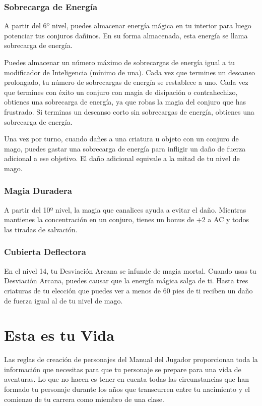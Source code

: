 \documentclass[a4paper,twocolumn,openany,10pt]{dndbook}
\begin{document}
\subsubsection{Sobrecarga de Energía}
A partir del 6º nivel, puedes almacenar energía mágica en tu interior para luego potenciar tus conjuros dañinos. En su forma
almacenada, esta energía se llama sobrecarga de energía.

Puedes almacenar un número máximo de sobrecargas de energía igual a tu modificador de Inteligencia (mínimo de una). Cada vez
que termines un descanso prolongado, tu número de sobrecargas de energía se restablece a uno. Cada vez que termines con éxito
un conjuro con magia de disipación o contrahechizo, obtienes una sobrecarga de energía, ya que robas la magia del conjuro que
has frustrado. Si terminas un descanso corto sin sobrecargas de energía, obtienes una sobrecarga de energía.

Una vez por turno, cuando dañes a una criatura u objeto con un conjuro de mago, puedes gastar una sobrecarga de energía para
infligir un daño de fuerza adicional a ese objetivo. El daño adicional equivale a la mitad de tu nivel de mago.

\subsubsection{Magia Duradera}
A partir del 10º nivel, la magia que canalices ayuda a evitar el daño. Mientras mantienes la concentración en un conjuro, tienes
un bonus de +2 a AC y todos las tiradas de salvación. 

\subsubsection{Cubierta Deflectora}
En el nivel 14, tu Desviación Arcana se infunde de magia mortal. Cuando usas tu Desviación Arcana, puedes causar que la energía
mágica salga de ti. Hasta tres criaturas de tu elección que puedes ver a menos de 60 pies de ti reciben un daño de fuerza igual
al de tu nivel de mago. 

\section{Esta es tu Vida}
Las reglas de creación de personajes del Manual del Jugador proporcionan toda la información que necesitas para que tu personaje
se prepare para una vida de aventuras. Lo que no hacen es tener en cuenta todas las circunstancias que han formado tu personaje
durante los años que transcurren entre tu nacimiento y el comienzo de tu carrera como miembro de una clase.
\end{document}
